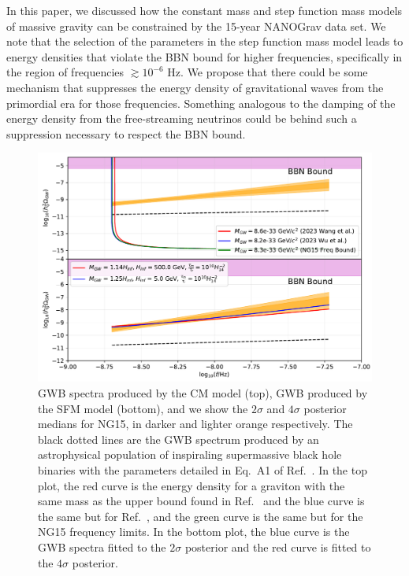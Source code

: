 \documentclass[prd,twocolumn,aps,psfig,nofootinbib,nobibnotes,superscriptaddress,preprintnumbers,times]{revtex4-2}
\begin{document}


In this paper, we discussed how the constant mass and step function mass models of massive gravity can be constrained by the 15-year NANOGrav data set. We note that the selection of the parameters in the step function mass model leads to energy densities that violate the BBN bound for higher frequencies, specifically in the region of frequencies $\gtrsim 10^{-6}$ Hz. We propose that there could be some mechanism that suppresses the energy density of gravitational waves from the primordial era for those frequencies. Something analogous to the damping of the energy density from the free-streaming neutrinos \cite{Weinberg:2004} could be behind such a suppression necessary to respect the BBN bound. 

\onecolumngrid
\begin{figure}
\includegraphics[width=\textwidth]{fig/fig8.pdf} 
\caption{GWB spectra produced by the CM model \cite{Gumrukcuoglu:2012} (top), GWB produced by the SFM model \cite{Fujita:2018} (bottom), and we show the $2\sigma$ and $4\sigma$ posterior medians for NG15, in darker and lighter orange respectively. The black dotted lines are the GWB spectrum produced by an astrophysical population of inspiraling supermassive black hole binaries with the parameters detailed in Eq.\ A1 of Ref.\ \cite{Afzal:2023}. In the top plot, the red curve is the energy density for a graviton with the same mass as the upper bound found in Ref.\ \cite{Wang:2023} and the blue curve is the same but for Ref.\ \cite{Wu:2023}, and the green curve is the same but for the NG15 frequency limits. In the bottom plot, the blue curve is the GWB spectra fitted to the $2\sigma$ posterior and the red curve is fitted to the $4\sigma$ posterior.}
\label{fig:GWB}
\end{figure}
\twocolumngrid
\end{document}
